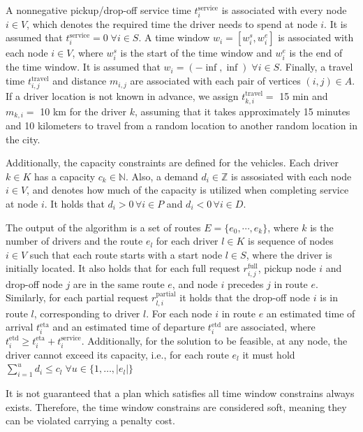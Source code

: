     A nonnegative pickup/drop-off service time $t^{\mathrm{service}}_i$ is associated with every node $i \in V$, which denotes the required time the driver needs to spend at node $i$. It is assumed that $t^{\mathrm{service}}_i = 0\;\forall i \in S$. A time window $w_i = [w^s_i, w^e_i]$ is associated with each node $i \in V$, where $w^s_i$ is the start of the time window and $w^e_i$ is the end of the time window. It is assumed that $w_i = (-\inf, \inf)\;\forall i \in S$. Finally, a travel time $t^{\mathrm{travel}}_{i,j}$ and distance $m_{i,j}$ are associated with each pair of vertices $(i, j) \in A$. If a driver location is not known in advance, we assign $t^{\mathrm{travel}}_{k,i} = $ 15 min and $m_{k,i} = $ 10 km for the driver $k$, assuming that it takes approximately 15 minutes and 10 kilometers to travel from a random location to another random location in the city.
    
    Additionally, the capacity constraints are defined for the vehicles. Each driver $k \in K$ has a capacity $c_k \in \mathbb{N}$. Also, a demand $d_i \in \mathbb{Z}$ is assosiated with each node $i \in V$, and denotes how much of the capacity is utilized when completing service at node $i$. It holds that $d_i > 0\,\forall i \in P$ and $d_i < 0\,\forall i \in D$.
    
    The output of the algorithm is a set of routes $E = \{e_0,\cdots,e_k\}$, where $k$ is the number of drivers and the route $e_l$ for each driver $l \in K$ is sequence of nodes $i \in V$ such that each route starts with a start node $l \in S$, where the driver is initially located. It also holds that for each full request $r^{\mathrm{full}}_{i,j}$, pickup node $i$ and drop-off node $j$ are in the same route $e$, and node $i$ precedes $j$ in route $e$. Similarly, for each partial request $r^{\mathrm{partial}}_{l,i}$ it holds that the drop-off node $i$ is in route $l$, corresponding to driver $l$. For each node $i$ in route $e$ an estimated time of arrival $t^{\mathrm{eta}}_i$ and an estimated time of departure $t^{\mathrm{etd}}_i$ are associated, where $t^{\mathrm{etd}}_i \geq t^{\mathrm{eta}}_i + t^{\mathrm{service}}_i$. Additionally, for the solution to be feasible, at any node, the driver cannot exceed its capacity, i.e., for each route $e_l$ it must hold $\sum_{i = 1}^{u} d_i \leq c_l\; \forall u \in \{1,\ldots,|e_l|\}$
    
    It is not guaranteed that a plan which satisfies all time window constrains always exists. Therefore, the time window constrains are considered soft, meaning they can be violated carrying a penalty cost.
    

